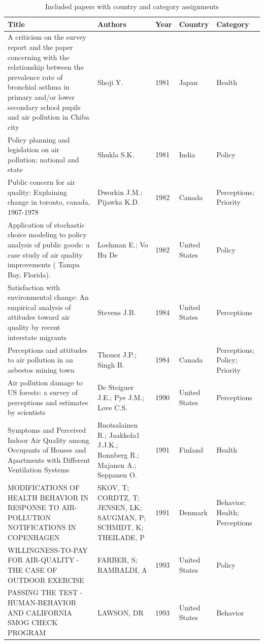 {\fontsize{8}{10}\selectfont

\begin{longtable}[t]{p{6cm}p{3cm}lp{3cm}p{3cm}}
\caption{\label{tab:papers}Included papers with country and category assignments}\\
\toprule
Title & Authors & Year & Country & Category\\
\midrule
A criticism on the survey report and the paper concerning with the relationship between the prevalence rate of bronchial asthma in primary and/or lower secondary school pupils and air pollution in Chiba city & Shoji Y. & 1981 & Japan & Health\\
Policy planning and legislation on air pollution; national and state & Shukla S.K. & 1981 & India & Policy\\
Public concern for air quality: Explaining change in toronto, canada, 1967-1978 & Dworkin J.M.; Pijawka K.D. & 1982 & Canada & Perceptions; Priority\\
Application of stochastic choice modeling to policy analysis of public goods: a case study of air quality improvements ( Tampa Bay, Florida). & Loehman E.; Vo Hu De & 1982 & United States & Policy\\
Satisfaction with environmental change: An empirical analysis of attitudes toward air quality by recent interstate migrants & Stevens J.B. & 1984 & United States & Perceptions\\
\addlinespace
Perceptions and attitudes to air pollution in an asbestos mining town & Thouez J.P.; Singh B. & 1984 & Canada & Perceptions; Policy; Priority\\
Air pollution damage to US forests: a survey of perceptions and estimates by scientists & De Steiguer J.E.; Pye J.M.; Love C.S. & 1990 & United States & Perceptions\\
Symptoms and Perceived Indoor Air Quality among Occupants of Houses and Apartments with Different Ventilation Systems & Ruotsalainen R.; Jaakkola1 J.J.K.; Ronnberg R.; Majanen A.; Seppanen O. & 1991 & Finland & Health\\
MODIFICATIONS OF HEALTH BEHAVIOR IN RESPONSE TO AIR-POLLUTION NOTIFICATIONS IN COPENHAGEN & SKOV, T; CORDTZ, T; JENSEN, LK; SAUGMAN, P; SCHMIDT, K; THEILADE, P & 1991 & Denmark & Behavior; Health; Perceptions\\
WILLINGNESS-TO-PAY FOR AIR-QUALITY - THE CASE OF OUTDOOR EXERCISE & FARBER, S; RAMBALDI, A & 1993 & United States & Policy\\
\addlinespace
PASSING THE TEST - HUMAN-BEHAVIOR AND CALIFORNIA SMOG CHECK PROGRAM & LAWSON, DR & 1993 & United States & Behavior\\

\end{longtable}}
